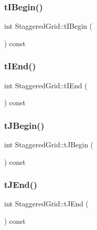 \subsubsection{\texorpdfstring{tIBegin()}{tIBegin()}}
{\footnotesize\ttfamily int Staggered\+Grid\+::t\+I\+Begin (\begin{DoxyParamCaption}{ }\end{DoxyParamCaption}) const}

\mbox{\label{classStaggeredGrid_a056b7f4154ca679441d69bf692d7a935}} 
\subsubsection{\texorpdfstring{tIEnd()}{tIEnd()}}
{\footnotesize\ttfamily int Staggered\+Grid\+::t\+I\+End (\begin{DoxyParamCaption}{ }\end{DoxyParamCaption}) const}

\mbox{\label{classStaggeredGrid_adf3e00c08dcd2e35d91577443e4ead1f}} 
\subsubsection{\texorpdfstring{tJBegin()}{tJBegin()}}
{\footnotesize\ttfamily int Staggered\+Grid\+::t\+J\+Begin (\begin{DoxyParamCaption}{ }\end{DoxyParamCaption}) const}

\mbox{\label{classStaggeredGrid_a7e63766ceb3fd216875a8bfa3154c920}} 
\subsubsection{\texorpdfstring{tJEnd()}{tJEnd()}}
{\footnotesize\ttfamily int Staggered\+Grid\+::t\+J\+End (\begin{DoxyParamCaption}{ }\end{DoxyParamCaption}) const}

\mbox{\label{classStaggeredGrid_afd742febc872b98795e2a47835815685}} 
